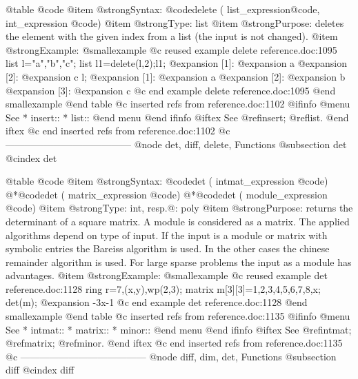 @table @code
@item @strong{Syntax:}
@code{delete (} list_expression@code{,} int_expression @code{)}
@item @strong{Type:}
list
@item @strong{Purpose:}
deletes the element with the given index from a list (the input is not changed).
@item @strong{Example:}
@smallexample
@c reused example delete reference.doc:1095 
  list l="a","b","c";
  list l1=delete(l,2);l1;
@expansion{} [1]:
@expansion{}    a
@expansion{} [2]:
@expansion{}    c
  l;
@expansion{} [1]:
@expansion{}    a
@expansion{} [2]:
@expansion{}    b
@expansion{} [3]:
@expansion{}    c
@c end example delete reference.doc:1095
@end smallexample
@end table
@c inserted refs from reference.doc:1102
@ifinfo
@menu
See
* insert::
* list::
@end menu
@end ifinfo
@iftex
See
@ref{insert};
@ref{list}.
@end iftex
@c end inserted refs from reference.doc:1102
@c ---------------------------------------
@node det, diff, delete, Functions
@subsection det
@cindex det

@table @code
@item @strong{Syntax:}
@code{det (} intmat_expression @code{)}
@*@code{det (} matrix_expression @code{)}
@*@code{det (} module_expression @code{)}
@item @strong{Type:}
int, resp.@: poly
@item @strong{Purpose:}
returns the determinant of a square matrix. A module is considered
as a matrix. The applied algorithms depend on type of input.
If the input is a module or matrix with symbolic entries the
Bareiss algorithm is used. In the other cases the chinese remainder
algorithm is used. For large sparse problems the input as a module
has advantages.
@item @strong{Example:}
@smallexample
@c reused example det reference.doc:1128 
  ring r=7,(x,y),wp(2,3);
  matrix m[3][3]=1,2,3,4,5,6,7,8,x;
  det(m);
@expansion{} -3x-1
@c end example det reference.doc:1128
@end smallexample
@end table
@c inserted refs from reference.doc:1135
@ifinfo
@menu
See
* intmat::
* matrix::
* minor::
@end menu
@end ifinfo
@iftex
See
@ref{intmat};
@ref{matrix};
@ref{minor}.
@end iftex
@c end inserted refs from reference.doc:1135
@c ---------------------------------------
@node diff, dim, det, Functions
@subsection diff
@cindex diff

